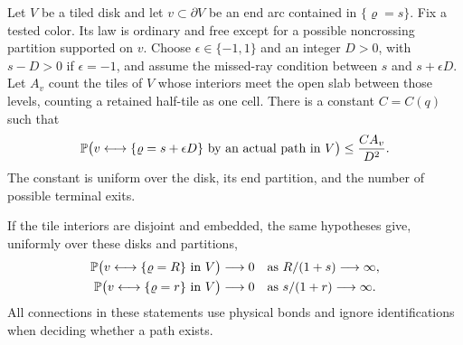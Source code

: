 \begin{lemma}\label{lem:branching}
Let $V$ be a tiled disk and let $v\subset\partial V$ be an end arc
contained in $\{\varrho=s\}$.  Fix a tested color.  Its law is ordinary and
free except for a possible noncrossing partition supported on $v$.
Choose $\epsilon\in\{-1,1\}$ and an integer $D>0$, with $s-D>0$ if
$\epsilon=-1$, and assume the missed-ray condition between $s$ and
$s+\epsilon D$.  Let $A_v$ count the tiles of $V$ whose interiors meet
the open slab between those levels, counting a retained half-tile as
one cell.  There is a constant $C=C(q)$ such that
\begin{equation}\label{eq:disk-branching-area}
 \mathbb P\bigl(v\longleftrightarrow\{\varrho=s+\epsilon D\}
                 \text{ by an actual path in }V\bigr)
 \le \frac{C A_v}{D^2}.
\end{equation}
The constant is uniform over the disk, its end partition, and the number
of possible terminal exits.

If the tile interiors are disjoint and embedded, the same hypotheses
 give, uniformly over these disks and partitions,
\begin{align}
 \mathbb P\bigl(v\longleftrightarrow\{\varrho=R\}\text{ in }V\bigr)
     &\longrightarrow0 &&\text{as }R/(1+s)\longrightarrow\infty,
       \label{eq:disk-branching-out}\\
 \mathbb P\bigl(v\longleftrightarrow\{\varrho=r\}\text{ in }V\bigr)
     &\longrightarrow0 &&\text{as }s/(1+r)\longrightarrow\infty.
       \label{eq:disk-branching-in}
\end{align}
All connections in these statements use physical bonds and ignore
identifications when deciding whether a path exists.
\end{lemma}

